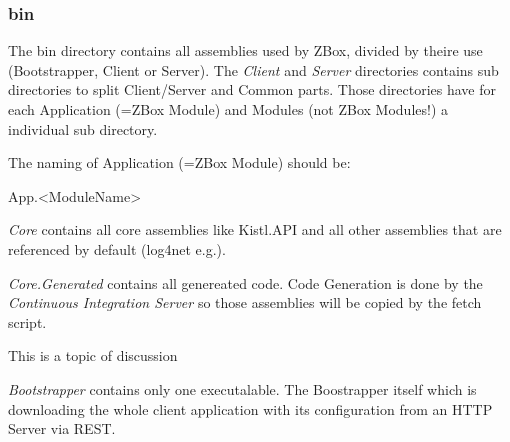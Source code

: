 \subsubsection{bin}
The bin directory contains all assemblies used by ZBox, divided by theire use
(Bootstrapper, Client or Server). The \emph{Client} and \emph{Server}
directories contains sub directories to split Client/Server and Common parts.
Those directories have for each Application (=ZBox Module) and Modules (not ZBox
Modules!) a individual sub directory.

The naming of Application (=ZBox Module) should be:

\begin{center}
App.\textless ModuleName\textgreater  
\end{center}

\emph{Core} contains all core assemblies like Kistl.API and all other
assemblies that are referenced by default (log4net e.g.).

\emph{Core.Generated} contains all genereated code. Code Generation is done by
the \emph{Continuous Integration Server} so those assemblies will be copied by
the fetch script.

\begin{note}
This is a topic of discussion
\end{note}

\emph{Bootstrapper} contains only one executalable. The Boostrapper itself which
is downloading the whole client application with its configuration from an HTTP
Server via REST.
